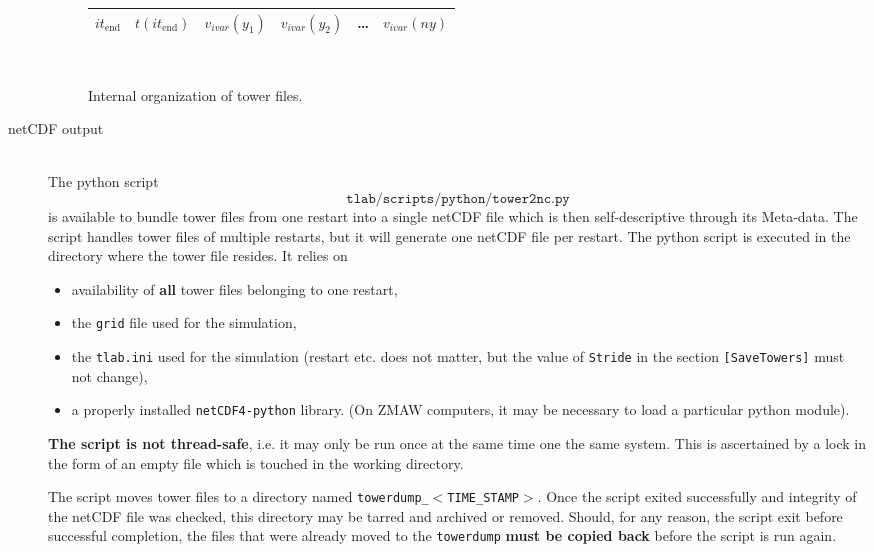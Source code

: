 \begin{description}
\begin{figure}
\begin{centering}
\begin{tabular}{| l | l | c | c | c | c | }
        $it_\mathrm{end}$   & $t(it_\mathrm{end})$ & $v_{ivar}(y_1)$ & $v_{ivar}(y_2)$ & \ldots & $v_{ivar}(ny)$ \\
        \hline
      \end{tabular}\\
    \end{centering}
  \caption{Internal organization of tower files.}
   \end{figure}
  \item[netCDF output]~ \\
    The python script \[\texttt{tlab/scripts/python/tower2nc.py}\] is available to bundle tower files from one restart into a single netCDF file which
    is then self-descriptive through its Meta-data. The script handles tower files of multiple restarts, but it will generate one netCDF file per restart.
    The python script is executed in the directory where the tower file resides.
    It relies on
    \begin{itemize}
      \item availability of \textbf{all} tower files belonging to one restart,
      \item the \texttt{grid} file used for the simulation,
      \item the \texttt{tlab.ini} used for the simulation (restart etc. does not matter, but the value of \texttt{Stride}
        in the section \texttt{[SaveTowers]} must not change),
      \item a properly installed \texttt{netCDF4-python} library. (On ZMAW computers, it may be necessary to load a particular
        python module).

    \end{itemize}
    \textbf{The script is not thread-safe}, i.e. it may only be run once at the same time
    one the same system. This is ascertained by a lock in the form of an empty file which is touched
    in the working directory.
    \par
    The script moves tower files to a directory named \texttt{towerdump\_}$<$\texttt{TIME\_STAMP}$>$. Once the script
    exited successfully and integrity of the netCDF file was checked, this directory may be tarred and archived or removed.
    Should, for any reason, the script exit before successful completion, the files that were already moved to the \texttt{towerdump}
    \textbf{must be copied back} before the script is run again.
\end{description}

